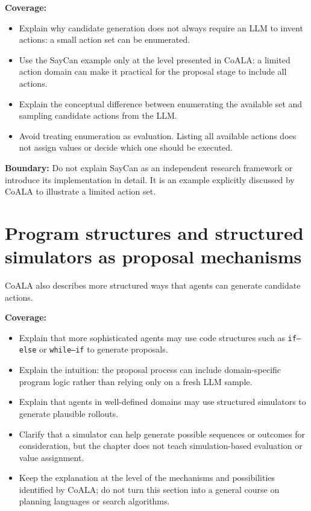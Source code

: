 \textbf{Coverage:}
\begin{itemize}
  \item Explain why candidate generation does not always require an LLM to invent actions: a small action set can be enumerated.
  \item Use the SayCan example only at the level presented in CoALA: a limited action domain can make it practical for the proposal stage to include all actions.
  \item Explain the conceptual difference between enumerating the available set and sampling candidate actions from the LLM.
  \item Avoid treating enumeration as evaluation. Listing all available actions does not assign values or decide which one should be executed.
\end{itemize}

\textbf{Boundary:} Do not explain SayCan as an independent research framework or introduce its implementation in detail. It is an example explicitly discussed by CoALA to illustrate a limited action set. 

\section{Program structures and structured simulators as proposal mechanisms}
CoALA also describes more structured ways that agents can generate candidate actions.

\textbf{Coverage:}
\begin{itemize}
  \item Explain that more sophisticated agents may use code structures such as \texttt{if--else} or \texttt{while--if} to generate proposals.
  \item Explain the intuition: the proposal process can include domain-specific program logic rather than relying only on a fresh LLM sample.
  \item Explain that agents in well-defined domains may use structured simulators to generate plausible rollouts.
  \item Clarify that a simulator can help generate possible sequences or outcomes for consideration, but the chapter does not teach simulation-based evaluation or value assignment.
  \item Keep the explanation at the level of the mechanisms and possibilities identified by CoALA; do not turn this section into a general course on planning languages or search algorithms.
\end{itemize}


